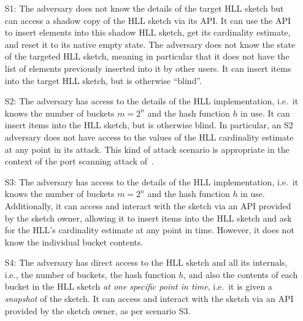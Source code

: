 \documentclass{article}
\begin{document}
\begin{itemize}
\item[S1:] The adversary does not know the details of the target HLL sketch but can access a shadow copy of the HLL sketch via its API. It can use the API to insert elements into this shadow HLL sketch, get its cardinality estimate, and reset it to its native empty state. The adversary does not know the state of the targeted HLL sketch, meaning in particular that it does not have the list of elements previously inserted into it by other users. It can insert items into the target HLL sketch, but is otherwise ``blind''. 
\item[S2:] The adversary has access to the details of the HLL implementation, i.e.\ it knows the number of buckets $m=2^n$ and the hash function $h$ in use. It can insert items into the HLL sketch, but is otherwise blind. In particular, an S2 adversary does not have access to the values of the HLL cardinality estimate at any point in its attack. This kind of attack scenario is appropriate in the context of the port scanning attack of~\cite{portscanhll}.
\item[S3:] The adversary has access to the details of the HLL implementation, i.e.\ it knows the number of buckets $m=2^n$ and the hash function $h$ in use. Additionally, it can access and interact with the sketch via an API provided by the sketch owner, allowing it to insert items into the HLL sketch and ask for the HLL's cardinality estimate at any point in time. However, it does not know the individual bucket contents.
\item[S4:] The adversary has direct access to the HLL sketch and all its internals, i.e., the number of buckets, the hash function $h$, and also the contents of each bucket in the HLL sketch \emph{at one specific point in time}, i.e.\ it is given a \emph{snapshot} of the sketch. It can access and interact with the sketch via an API provided by the sketch owner, as per scenario S3. 
\end{itemize}
\end{document}
